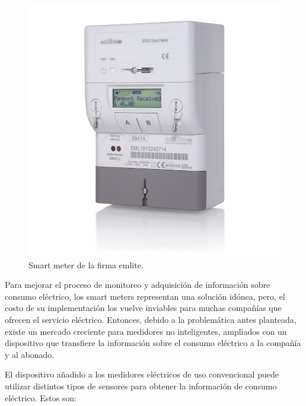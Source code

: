 \begin{figure}[h]
	\centering
	\includegraphics[scale=0.29]{./Figures/smart_meter.jpg}
	\caption{Smart meter de la firma emlite\protect\footnotemark.}
	\label{fig:smartMeter}
\end{figure}


Para mejorar el proceso de monitoreo y adquisición de información sobre consumo eléctrico, los smart meters representan una solución idónea, pero, el costo de su implementación los vuelve inviables para muchas compañías que ofrecen el servicio eléctrico. Entonces, debido a la problemática antes planteada, existe un mercado creciente para medidores no inteligentes, ampliados con un dispositivo que transfiere la información sobre el consumo eléctrico a la compañía y al abonado.

El dispositivo añadido a los medidores eléctricos de uso convencional puede utilizar distintos tipos de sensores para obtener la información de consumo eléctrico. Estos son:

